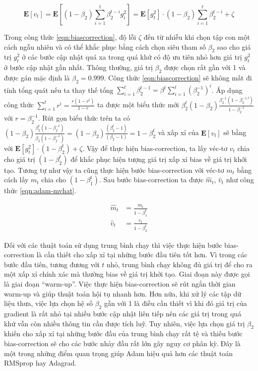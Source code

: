 \begin{equation}
	\label{eqn:bias-correction}
	\mathbf{E}[v_t] = \mathbf{E}[(1-\beta_2)\sum_{i=1}^t\beta_2^{t-i}g_i^2] = \mathbf{E}[g_t^2]\cdot(1-\beta_2)\sum_{i=1}^t\beta_2^{t-i}+\zeta
\end{equation}

Trong công thức \ref{eqn:biascorrection}, độ lỗi $\zeta$ đến từ nhiễu khi chọn tập con một cách ngẫu nhiên và có thể khắc phục bằng cách chọn siêu tham số $\beta_2$ sao cho giá trị $g_t^2$ ở các bước cập nhật quá xa trong quá khứ có độ ưu tiên nhỏ hơn giá trị $g_t^2$ ở bước cập nhật gần nhất. Thông thường, giá trị $\beta_2$ được chọn rất gần với 1 và được gán mặc định là $\beta_2 = 0.999$. Công thức \ref{eqn:biascorrection} sẽ không mất đi tính tổng quát nếu ta thay thế tổng $\sum_{i=1}^t\beta_2^{t-1} = \beta^t \sum_{i=1}^t(\beta_2^{-1})^i$. Áp dụng công thức $\sum_{i=1}^t r^i = \frac{r(1 - r^t)}{1-r}$ ta được một biểu thức mới $\beta_2^t (1-\beta_2)\frac{\beta_2^{-1}(1 - \beta_2^{-1.t})}{1 - \beta_2^{-1}}$ với $r = \beta_2^{-1}$. Rút gọn biểu thức trên ta có $(1-\beta_2)\frac{\beta_2^{t}(1 - \beta_2^{-t})}{\beta_2(1 - \beta_2^{-1})} = (1-\beta_2)\frac{(\beta_2^{t} - 1)}{(\beta_2 - 1)} = 1 - \beta_2^t$ và xấp xỉ của $\mathbf{E}[v_t]$ sẽ bằng với $\mathbf{E}[g_t^2]\cdot (1-\beta_2^t) + \zeta$. Vậy để thực hiện bias-correction, ta lấy véc-tơ $v_t$ chia cho giá trị $(1 - \beta_2^t)$ để khắc phục hiện tượng giá trị xấp xỉ bias về giá trị khởi tạo. Tương tự như vậy ta cũng thực hiện bước bias-correction với véc-tơ $m_t$ bằng cách lấy $m_t$ chia cho $(1-\beta_1^t)$. Sau bước bias-correction ta được $\hat m_t$, $\hat v_t$ như công thức \ref{eqn:adam-mvhat}.

\begin{equation}
	\label{eqn:adam-mvhat}
	\begin{aligned}
		\hat m_t &= \frac{m_t}{1-\beta_1^t} \\
		\hat v_t &= \frac{v_t}{1-\beta_2^t}
	\end{aligned}
\end{equation}

Đối với các thuật toán sử dụng trung bình chạy thì việc thực hiện bước bias-correction là cần thiết cho xấp xỉ tại những bước đầu tiên tốt hơn. Vì trong các bước đầu tiên, tương đương với $t$ nhỏ, trung bình chạy không đủ giá trị để cho ra một xấp xỉ chính xác mà thường bias về giá trị khởi tạo. Giai đoạn này được gọi là giai đoạn ``warm-up''. Việc thực hiện bias-correction sẽ rút ngắn thời gian warm-up và giúp thuật toán hội tụ nhanh hơn. Hơn nữa, khi xử lý các tập dữ liệu thưa, việc lựa chọn hệ số $\beta_2$ gần với 1 là điều cần thiết vì khi đó giá trị của gradient là rất nhỏ tại nhiều bước cập nhật liên tiếp nên các giá trị trong quá khứ vẫn còn nhiều thông tin cần được tích luỹ. Tuy nhiên, việc lựa chọn giá trị $\beta_2$ khiến cho xấp xỉ tại những bước đầu của trung bình chạy rất tệ và thiếu bước bias-correction sẽ cho các bước nhảy đầu rất lớn gây nguy cơ phân kỳ. Đây là một trong những điểm quan trọng giúp Adam hiệu quả hơn các thuật toán RMSprop hay Adagrad.

